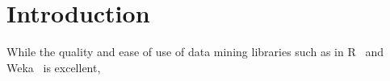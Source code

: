 \section{Introduction}
While the quality and ease of use of data mining libraries such as in R~\cite{R2008} and Weka~\cite{Hall2009} is excellent,